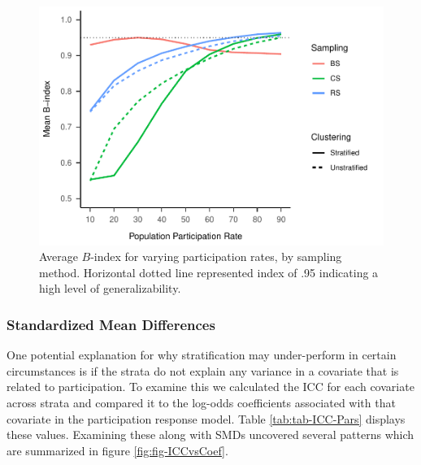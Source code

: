 \documentclass[man,floatsintext]{apa6}
\begin{document}
\begin{figure}
\centering
\includegraphics{GenSamp-Paper_files/figure-latex/fig-avg-Bindex-1.pdf}
\caption{\label{fig:fig-avg-Bindex}Average \(B\)-index for varying participation rates, by sampling method. Horizontal dotted line represented index of .95 indicating a high level of generalizability.}
\end{figure}

\hypertarget{standardized-mean-differences}{%
\subsubsection{Standardized Mean Differences}\label{standardized-mean-differences}}

One potential explanation for why stratification may under-perform in certain circumstances is if the strata do not explain any variance in a covariate that is related to participation. To examine this we calculated the ICC for each covariate across strata and compared it to the log-odds coefficients associated with that covariate in the participation response model. Table \ref{tab:tab-ICC-Pars} displays these values. Examining these along with SMDs uncovered several patterns which are summarized in figure \ref{fig:fig-ICCvsCoef}.
\end{document}
